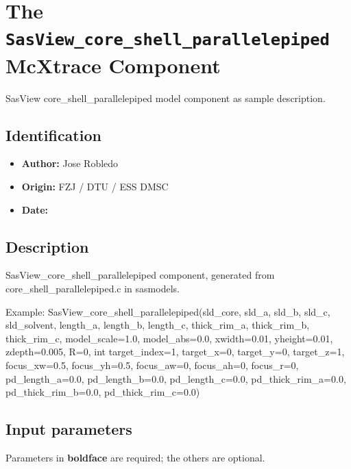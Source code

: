 \section{The \texttt{SasView\_core\_shell\_parallelepiped} McXtrace Component}
SasView core\_shell\_parallelepiped model component as sample description.

\subsection*{Identification}
\begin{itemize}
  \item \textbf{Author:} Jose Robledo
  \item \textbf{Origin:} FZJ / DTU / ESS DMSC
  \item \textbf{Date:} 
\end{itemize}

\subsection*{Description}
SasView\_core\_shell\_parallelepiped component, generated from core\_shell\_parallelepiped.c in sasmodels.

Example: SasView\_core\_shell\_parallelepiped(sld\_core, sld\_a, sld\_b, sld\_c, sld\_solvent, length\_a, length\_b, length\_c, thick\_rim\_a, thick\_rim\_b, thick\_rim\_c, model\_scale=1.0, model\_abs=0.0, xwidth=0.01, yheight=0.01, zdepth=0.005, R=0, int target\_index=1, target\_x=0, target\_y=0, target\_z=1, focus\_xw=0.5, focus\_yh=0.5, focus\_aw=0, focus\_ah=0, focus\_r=0, pd\_length\_a=0.0, pd\_length\_b=0.0, pd\_length\_c=0.0, pd\_thick\_rim\_a=0.0, pd\_thick\_rim\_b=0.0, pd\_thick\_rim\_c=0.0)

\subsection*{Input parameters}
Parameters in \textbf{boldface} are required; the others are optional.

